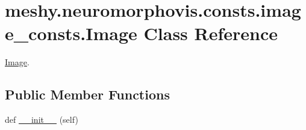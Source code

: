 \hypertarget{classmeshy_1_1neuromorphovis_1_1consts_1_1image__consts_1_1Image}{}\section{meshy.\+neuromorphovis.\+consts.\+image\+\_\+consts.\+Image Class Reference}
\label{classmeshy_1_1neuromorphovis_1_1consts_1_1image__consts_1_1Image}


\hyperlink{classmeshy_1_1neuromorphovis_1_1consts_1_1image__consts_1_1Image}{Image}.  


\subsection*{Public Member Functions}
\begin{DoxyCompactItemize}
\item 
def \hyperlink{classmeshy_1_1neuromorphovis_1_1consts_1_1image__consts_1_1Image_ab8fc9a278b2fcdbda465e86e53269299}{\+\_\+\+\_\+init\+\_\+\+\_\+} (self)\hypertarget{classmeshy_1_1neuromorphovis_1_1consts_1_1image__consts_1_1Image_ab8fc9a278b2fcdbda465e86e53269299}{}\label{classmeshy_1_1neuromorphovis_1_1consts_1_1image__consts_1_1Image_ab8fc9a278b2fcdbda465e86e53269299}

\end{DoxyCompactItemize}
